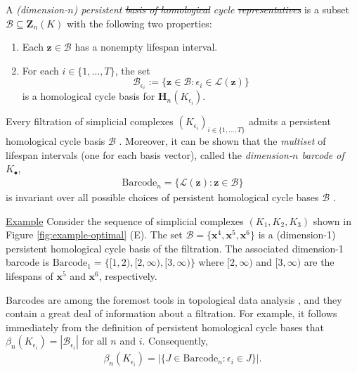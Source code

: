 \documentclass[utf8]{formatting_stuff/frontiersFPHY}
\newcommand{\Homologies}[0]{\mathbf{H}}
\newcommand{\Cycles}[0]{\mathbf{Z}}
\newcommand{\optimalrep}{\mathbf{x}}
\newcommand{\cycle}{{\mathbf z}}
\newcommand{\barcode}{\mathrm{Barcode}}
\newcommand{\persinterval}{\mathcal{L}}
\newcommand{\interval}{J}
\newcommand{\hcyclebasis}{\mathcal B}
\theoremstyle{plain}
\theoremstyle{definition}
\providecommand{\DIFaddtex}[1]{{\protect\color{blue}\uwave{#1}}}
\providecommand{\DIFdeltex}[1]{{\protect\color{red}\sout{#1}}}
\providecommand{\DIFaddbegin}{} %
\providecommand{\DIFaddend}{} %
\providecommand{\DIFdelbegin}{} %
\providecommand{\DIFdelend}{} %
\providecommand{\DIFadd}[1]{\texorpdfstring{\DIFaddtex{#1}}{#1}} %
\providecommand{\DIFdel}[1]{\texorpdfstring{\DIFdeltex{#1}}{}} %
\begin{document}
A \emph{(dimension-$n$) persistent \DIFdelbegin \DIFdel{basis of  homological }\DIFdelend \DIFaddbegin \DIFadd{homology }\DIFaddend cycle \DIFdelbegin \DIFdel{representatives}\DIFdelend \DIFaddbegin \DIFadd{basis}\DIFaddend } is a subset $\hcyclebasis \subseteq \Cycles_n(K)$ with the following two properties:
    \begin{enumerate}
    \item Each $\cycle \in \hcyclebasis$ has a nonempty lifespan interval.
    \item For each $i \in \{1, \ldots, T\}$, the set 
        $$
        \hcyclebasis_{\epsilon_i} 
        := 
        \{\cycle \in \hcyclebasis : \epsilon_i \in \persinterval(\cycle) \}
        $$
    is a homological cycle basis for $\Homologies_n(K_{\epsilon_i})$.
    \end{enumerate}

 
Every filtration of simplicial complexes $ (K_{\epsilon_i})_{i \in\{ 1, \ldots, T\}}$ admits a  persistent homological cycle basis  $\hcyclebasis$ \cite{zomorodiancarlssoncomputingph}.  
Moreover, it can be shown that the \emph{multiset} of lifespan intervals (one for each basis vector), called the \emph{dimension-$n$ barcode of $K_\bullet$},
    \begin{align*}
        \barcode_n = 
        \{ \persinterval(\cycle) : \cycle \in \hcyclebasis \}
    \end{align*}
is invariant over all possible choices of persistent homological cycle bases $\hcyclebasis$ \cite{zomorodiancarlssoncomputingph}.  

\noindent \underline{Example}  Consider the sequence of simplicial complexes $(K_1, K_2, K_3)$ shown in Figure \ref{fig:example-optimal} (E).  The set
    $
        \hcyclebasis = \{\optimalrep^4, \optimalrep^5, \optimalrep^6 \}
    $
is a (dimension-1) persistent homological cycle basis of the filtration.  The associated dimension-1 barcode is     
    $
    \barcode_1 = \{[1,2), [2,\infty), [3, \infty) \} 
    $ 
where $[2,\infty)$ and $[3,\infty)$ are the lifespans of  $\optimalrep^5$ and $\optimalrep^6$, respectively.

Barcodes are among the foremost tools in topological data analysis \cite{barcodeGhrist,  persistenthomologyasurvey}, and they contain a great deal of information about a filtration.  For example, it follows  immediately from the definition of persistent homological cycle bases  that
    $
        \beta_n(K_{\epsilon_i})
        =
        |\hcyclebasis_{\epsilon_i}|
    $
for all $n$ and $i$.  Consequently,
    \begin{align*}
        \beta_n(K_{\epsilon_i})
        =
        |\{\interval \in \barcode_n : \epsilon_i \in \interval \}|.
    \end{align*}
\end{document}
